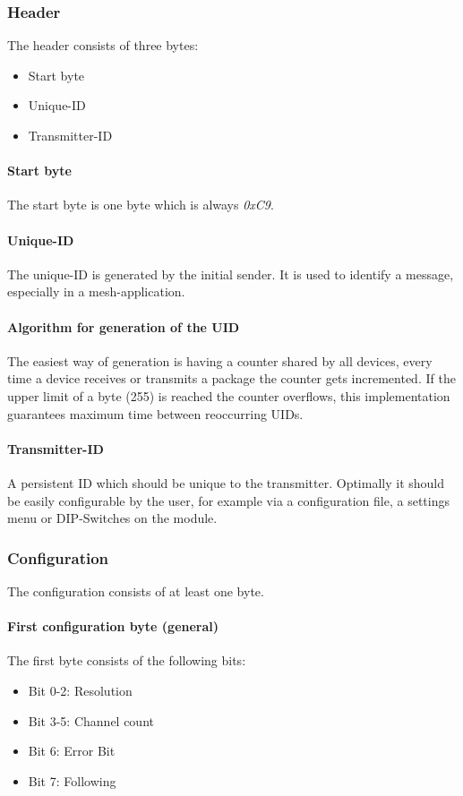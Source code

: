 \documentclass{article}
\begin{document}
  \subsubsection{Header}
    The header consists of three bytes:
    \begin{itemize}
      \item Start byte
      \item Unique-ID
      \item Transmitter-ID
    \end{itemize}

    \paragraph{Start byte}
    The start byte is one byte which is always \emph{0xC9}.

    \paragraph{Unique-ID}
     The unique-ID is generated by the initial sender. It is used to identify a
     message, especially in a mesh-application.

    \paragraph{Algorithm for generation of the UID}
     The easiest way of generation is having a counter shared by all devices,
     every time a device receives or transmits a package the counter gets
     incremented. If the upper limit of a byte (255) is reached the counter
     overflows, this implementation guarantees maximum time between reoccurring
     UIDs.

    \paragraph{Transmitter-ID}
     A persistent ID which should be unique to the transmitter. Optimally it
     should be easily configurable by the user, for example via a configuration
     file, a settings menu or DIP-Switches on the module.

  \subsubsection{Configuration}
    The configuration consists of at least one byte.

    \paragraph{First configuration byte (general)}
     The first byte consists of the following bits:
     \begin{itemize}
       \item Bit 0-2: Resolution
       \item Bit 3-5: Channel count
       \item Bit 6: Error Bit
       \item Bit 7: Following
     \end{itemize}
\end{document}
